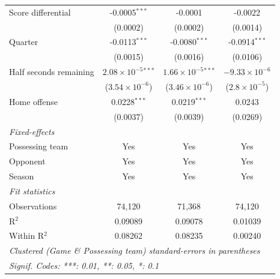 \begin{table}[htbp]
\begin{tabular}{lccc}
      Score differential                      & -0.0005$^{***}$               & -0.0001                       & -0.0022\\   
                                              & (0.0002)                      & (0.0002)                      & (0.0014)\\   
      Quarter                                 & -0.0113$^{***}$               & -0.0080$^{***}$               & -0.0914$^{***}$\\   
                                              & (0.0015)                      & (0.0016)                      & (0.0106)\\   
      Half seconds remaining                  & $2.08\times 10^{-5}$$^{***}$  & $1.66\times 10^{-5}$$^{***}$  & $-9.33\times 10^{-6}$\\    
                                              & ($3.54\times 10^{-6}$)        & ($3.46\times 10^{-6}$)        & ($2.8\times 10^{-5}$)\\    
      Home offense                            & 0.0228$^{***}$                & 0.0219$^{***}$                & 0.0243\\   
                                              & (0.0037)                      & (0.0039)                      & (0.0269)\\   
      \midrule
      \emph{Fixed-effects}\\
      Possessing team                         & Yes                           & Yes                           & Yes\\  
      Opponent                                & Yes                           & Yes                           & Yes\\  
      Season                                  & Yes                           & Yes                           & Yes\\  
      \midrule
      \emph{Fit statistics}\\
      Observations                            & 74,120                        & 71,368                        & 74,120\\  
      R$^2$                                   & 0.09089                       & 0.09078                       & 0.01039\\  
      Within R$^2$                            & 0.08262                       & 0.08235                       & 0.00240\\  
      \midrule \midrule
      \multicolumn{4}{l}{\emph{Clustered (Game \& Possessing team) standard-errors in parentheses}}\\
      \multicolumn{4}{l}{\emph{Signif. Codes: ***: 0.01, **: 0.05, *: 0.1}}\\
   \end{tabular}
\end{table}



